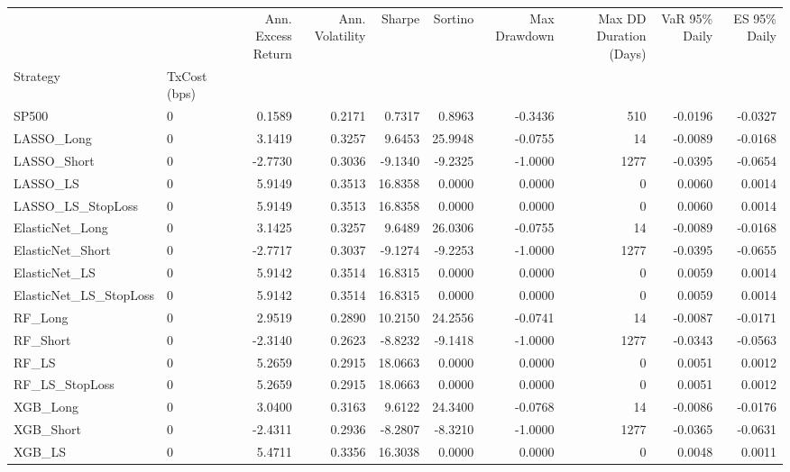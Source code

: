 \begin{tabular}{llrrrrrrrr}
\toprule
 &  & Ann. Excess Return & Ann. Volatility & Sharpe & Sortino & Max Drawdown & Max DD Duration (Days) & VaR 95\% Daily & ES 95\% Daily \\
Strategy & TxCost (bps) &  &  &  &  &  &  &  &  \\
\midrule
SP500 & 0 & 0.1589 & 0.2171 & 0.7317 & 0.8963 & -0.3436 & 510 & -0.0196 & -0.0327 \\
\cline{1-10}
LASSO\_Long & 0 & 3.1419 & 0.3257 & 9.6453 & 25.9948 & -0.0755 & 14 & -0.0089 & -0.0168 \\
\cline{1-10}
LASSO\_Short & 0 & -2.7730 & 0.3036 & -9.1340 & -9.2325 & -1.0000 & 1277 & -0.0395 & -0.0654 \\
\cline{1-10}
LASSO\_LS & 0 & 5.9149 & 0.3513 & 16.8358 & 0.0000 & 0.0000 & 0 & 0.0060 & 0.0014 \\
\cline{1-10}
LASSO\_LS\_StopLoss & 0 & 5.9149 & 0.3513 & 16.8358 & 0.0000 & 0.0000 & 0 & 0.0060 & 0.0014 \\
\cline{1-10}
ElasticNet\_Long & 0 & 3.1425 & 0.3257 & 9.6489 & 26.0306 & -0.0755 & 14 & -0.0089 & -0.0168 \\
\cline{1-10}
ElasticNet\_Short & 0 & -2.7717 & 0.3037 & -9.1274 & -9.2253 & -1.0000 & 1277 & -0.0395 & -0.0655 \\
\cline{1-10}
ElasticNet\_LS & 0 & 5.9142 & 0.3514 & 16.8315 & 0.0000 & 0.0000 & 0 & 0.0059 & 0.0014 \\
\cline{1-10}
ElasticNet\_LS\_StopLoss & 0 & 5.9142 & 0.3514 & 16.8315 & 0.0000 & 0.0000 & 0 & 0.0059 & 0.0014 \\
\cline{1-10}
RF\_Long & 0 & 2.9519 & 0.2890 & 10.2150 & 24.2556 & -0.0741 & 14 & -0.0087 & -0.0171 \\
\cline{1-10}
RF\_Short & 0 & -2.3140 & 0.2623 & -8.8232 & -9.1418 & -1.0000 & 1277 & -0.0343 & -0.0563 \\
\cline{1-10}
RF\_LS & 0 & 5.2659 & 0.2915 & 18.0663 & 0.0000 & 0.0000 & 0 & 0.0051 & 0.0012 \\
\cline{1-10}
RF\_LS\_StopLoss & 0 & 5.2659 & 0.2915 & 18.0663 & 0.0000 & 0.0000 & 0 & 0.0051 & 0.0012 \\
\cline{1-10}
XGB\_Long & 0 & 3.0400 & 0.3163 & 9.6122 & 24.3400 & -0.0768 & 14 & -0.0086 & -0.0176 \\
\cline{1-10}
XGB\_Short & 0 & -2.4311 & 0.2936 & -8.2807 & -8.3210 & -1.0000 & 1277 & -0.0365 & -0.0631 \\
\cline{1-10}
XGB\_LS & 0 & 5.4711 & 0.3356 & 16.3038 & 0.0000 & 0.0000 & 0 & 0.0048 & 0.0011 \\

\end{tabular}
